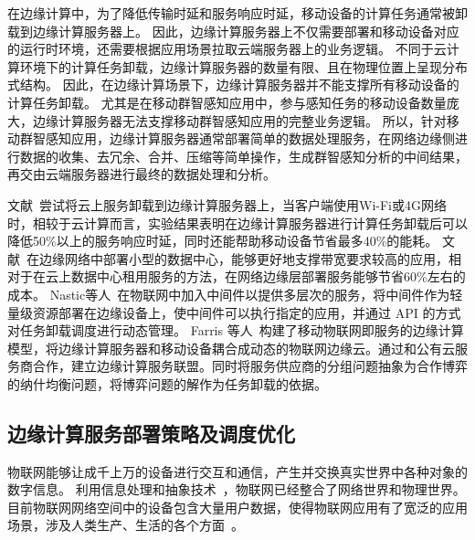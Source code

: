 在边缘计算中，为了降低传输时延和服务响应时延，移动设备的计算任务通常被卸载到边缘计算服务器上。
因此，边缘计算服务器上不仅需要部署和移动设备对应的运行时环境，还需要根据应用场景拉取云端服务器上的业务逻辑。
不同于云计算环境下的计算任务卸载，边缘计算服务器的数量有限、且在物理位置上呈现分布式结构。
因此，在边缘计算场景下，边缘计算服务器并不能支撑所有移动设备的计算任务卸载。
尤其是在移动群智感知应用中，参与感知任务的移动设备数量庞大，边缘计算服务器无法支撑移动群智感知应用的完整业务逻辑。
所以，针对移动群智感知应用，边缘计算服务器通常部署简单的数据处理服务，在网络边缘侧进行数据的收集、去冗余、合并、压缩等简单操作，生成群智感知分析的中间结果，再交由云端服务器进行最终的数据处理和分析。

文献~尝试将云上服务卸载到边缘计算服务器上，当客户端使用Wi-Fi或4G网络时，相较于云计算而言，实验结果表明在边缘计算服务器进行计算任务卸载后可以降低50\%以上的服务响应时延，同时还能帮助移动设备节省最多40\%的能耗。
文献~在边缘网络中部署小型的数据中心，能够更好地支撑带宽要求较高的应用，相对于在云上数据中心租用服务的方法，在网络边缘层部署服务能够节省60\%左右的成本。
Nastic等人~\cite{DBLP:conf/edge/NasticTD16}在物联网中加入中间件以提供多层次的服务，将中间件作为轻量级资源部署在边缘设备上，使中间件可以执行指定的应用，并通过 API 的方式对任务卸载调度进行动态管理。
Farris 等人~\cite{DBLP:journals/fgcs/FarrisMNAI17}构建了移动物联网即服务的边缘计算模型，将边缘计算服务器和移动设备耦合成动态的物联网边缘云。通过和公有云服务商合作，建立边缘计算服务联盟。同时将服务供应商的分组问题抽象为合作博弈的纳什均衡问题，将博弈问题的解作为任务卸载的依据。

\subsection{边缘计算服务部署策略及调度优化}

物联网能够让成千上万的设备进行交互和通信，产生并交换真实世界中各种对象的数字信息。
利用信息处理和抽象技术~\cite{DBLP:journals/iotj/GanzPBC15}，物联网已经整合了网络世界和物理世界。
目前物联网网络空间中的设备包含大量用户数据，使得物联网应用有了宽泛的应用场景，涉及人类生产、生活的各个方面~\cite{DBLP:journals/cm/WangYXJD17}。

